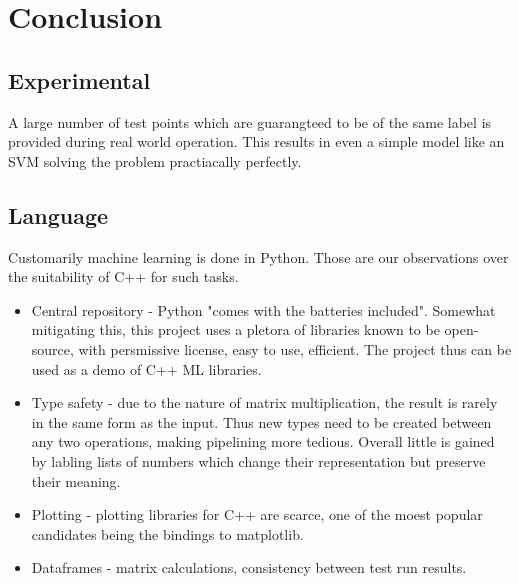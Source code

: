 \documentclass{article}
\begin{document}
\section{Conclusion}
\subsection{Experimental}
A large number of test points which are guarangteed to be of the same label is provided during real world operation.
This results in even a simple model like an SVM solving the problem practiacally perfectly.

\subsection{Language}
Customarily machine learning is done in Python.
Those are our observations over the suitability of C++ for such tasks.
\begin{itemize}
\item{Central repository - Python "comes with the batteries included".
                           Somewhat mitigating this, this project uses a pletora of libraries known to be open-source, with persmissive license, easy to use, efficient.
                           The project thus can be used as a demo of C++ ML libraries.
}
\item{Type safety - due to the nature of matrix multiplication, the result is rarely in the same form as the input.
                    Thus new types need to be created between any two operations, making pipelining more tedious.
                    Overall little is gained by labling lists of numbers which change their representation but preserve their meaning.}
\item{Plotting - plotting libraries for C++ are scarce, one of the moest popular candidates being the bindings to matplotlib.}
\item{Dataframes - matrix calculations, consistency between test run results.}
\end{itemize}


\printbibliography
\end{document}
